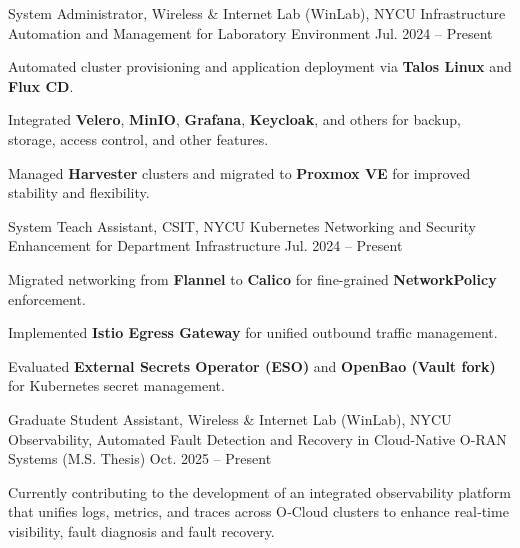 
\begin{cventries}

    
  \cventry
  {System Administrator, Wireless \& Internet Lab (WinLab), NYCU} %
  {Infrastructure Automation and Management for Laboratory Environment} %
  {} %
  {Jul. 2024 -- Present} %
  {
    \begin{cvitems}
      \item {Automated cluster provisioning and application deployment via \textbf{Talos Linux} and \textbf{Flux CD}.}
      \item {Integrated \textbf{Velero}, \textbf{MinIO}, \textbf{Grafana}, \textbf{Keycloak}, and others for backup, storage, access control, and other features.}
      \item {Managed \textbf{Harvester} clusters and migrated to \textbf{Proxmox VE} for improved stability and flexibility.}
    \end{cvitems}
  }
  \cventry
  {System Teach Assistant, CSIT, NYCU} %
  {Kubernetes Networking and Security Enhancement for Department Infrastructure} %
  {} %
  {Jul. 2024 -- Present} %
  {
    \begin{cvitems}
      \item {Migrated networking from \textbf{Flannel} to \textbf{Calico} for fine-grained \textbf{NetworkPolicy} enforcement.}
      \item { Implemented \textbf{Istio Egress Gateway} for unified outbound traffic management.}
      \item {Evaluated \textbf{External Secrets Operator (ESO)} and \textbf{OpenBao (Vault fork)} for Kubernetes secret management.}
    \end{cvitems}
  }
  \cventry
    {Graduate Student Assistant, Wireless \& Internet Lab (WinLab), NYCU} %
    {Observability, Automated Fault Detection and Recovery in Cloud-Native O-RAN Systems (M.S. Thesis)} %
    {} %
    {Oct. 2025 -- Present} %
    {
      \begin{cvitems}
        \item {Currently contributing to the development of an integrated observability platform that unifies logs, metrics, and traces
across O‑Cloud clusters to enhance real‑time visibility, fault diagnosis and fault recovery.}
      \end{cvitems}
    }
  

\end{cventries}
